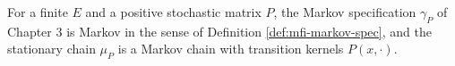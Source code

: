 \begin{proposition}
    \label{prop:mfi-finite-state}
    \leanok

    For a finite $E$ and a positive stochastic matrix $P$, the Markov specification $\gamma_P$ of
    Chapter 3 is Markov in the sense of Definition \ref{def:mfi-markov-spec}, and the stationary
    chain $\mu_P$ is a Markov chain with transition kernels $P(x, \cdot)$.
\end{proposition}
